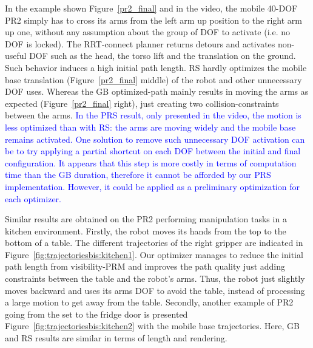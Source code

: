 \documentclass{tADR2e}
\begin{document}
In the example shown Figure~\ref{pr2_final} and in the video, the mobile 
40-DOF PR2 simply has to cross its arms from 
the left arm up position to the right arm up one, without any assumption about the group of DOF to activate (i.e. no DOF is locked). 
The RRT-connect planner 
returns detours and activates non-useful DOF such as the head, the torso lift 
and the translation on the ground. Such behavior induces a high initial path length. RS hardly optimizes the mobile base 
translation (Figure~\ref{pr2_final} middle) of the robot and other unnecessary DOF 
uses. Whereas the GB optimized-path mainly 
results in moving the arms as expected (Figure~\ref{pr2_final} right), just creating two collision-constraints between the arms. 
\textcolor{blue}{
In the PRS result, only presented in the video, the motion is less optimized than with RS: the arms are moving widely and the mobile base remains activated. One solution to remove such unnecessary DOF activation can be to try applying a partial shortcut on each DOF between the initial and final configuration. It appears that this step is more costly in terms of computation time than the GB duration, therefore it cannot be afforded by our PRS implementation. However, it could be applied as a preliminary optimization for each optimizer.
}

Similar results are obtained on the PR2 performing manipulation tasks 
in a kitchen environment.
Firstly, the robot moves its hands from the top to the bottom of a table.
The different trajectories of the right gripper are indicated in Figure~\ref{fig:trajectoriesbis:kitchen1}.
Our optimizer manages to reduce the initial path length from visibility-PRM 
and improves the path quality 
just adding constraints between the table and the 
robot's arms. Thus, the robot just slightly moves 
backward and uses its arms DOF to avoid the table, instead of 
processing a large motion to get away from the table.
Secondly, another example of PR2 going from the set to the fridge 
door is presented Figure~\ref{fig:trajectoriesbis:kitchen2} with the mobile base
trajectories. Here, GB and RS results are similar in terms of length and rendering.

\vspace{0.3cm}
\end{document}
